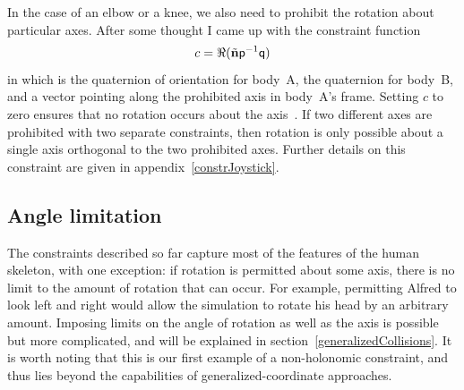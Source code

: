 In the case of an elbow or a knee, we also need to prohibit the rotation about particular axes.
After some thought I came up with the constraint function
\begin{equation}\label{rotationConstraintEqn}
c = \Re(\tilde{\ve{n}}\q{p}^{-1}\q{q})
\end{equation}
in which  is the quaternion of orientation for body~A,  the quaternion for body~B, and
 a vector pointing along the prohibited axis in body~A's frame. Setting $c$ to zero ensures
that no rotation occurs about the axis~. If two different axes are prohibited with two
separate constraints, then rotation is only possible about a single axis orthogonal to the two
prohibited axes. Further details on this constraint are given in appendix~\ref{constrJoystick}.

\subsection{Angle limitation\label{angleLimitation}}

The constraints described so far capture most of the features of the human skeleton, with one
exception: if rotation is permitted about some axis, there is no limit to the amount of rotation
that can occur. For example, permitting Alfred to look left and right would allow the simulation
to rotate his head by an arbitrary amount. Imposing
limits on the angle of rotation as well as the axis is possible but more complicated, and will
be explained in section~\ref{generalizedCollisions}. It is worth noting that this is our
first example of a non-holonomic constraint, and thus lies beyond the capabilities of
generalized-coordinate approaches.
